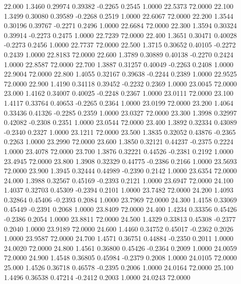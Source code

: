   22.000   1.3460   0.29974   0.39382  -0.2265   0.2545   1.0000  22.5373  72.0000
  22.100   1.3499   0.30080   0.39589  -0.2268   0.2519   1.0000  22.6067  72.0000
  22.200   1.3544   0.30196   0.39767  -0.2271   0.2496   1.0000  22.6684  72.0000
  22.300   1.3594   0.30324   0.39914  -0.2273   0.2475   1.0000  22.7239  72.0000
  22.400   1.3651   0.30471   0.40028  -0.2273   0.2456   1.0000  22.7737  72.0000
  22.500   1.3715   0.30652   0.40105  -0.2272   0.2439   1.0000  22.8183  72.0000
  22.600   1.3789   0.30889   0.40138  -0.2270   0.2424   1.0000  22.8587  72.0000
  22.700   1.3887   0.31257   0.40049  -0.2263   0.2408   1.0000  22.9004  72.0000
  22.800   1.4055   0.32167   0.39638  -0.2244   0.2389   1.0000  22.9525  72.0000
  22.900   1.4190   0.34118   0.39452  -0.2232   0.2369   1.0000  23.0045  72.0000
  23.000   1.4162   0.34007   0.40025  -0.2248   0.2367   1.0000  23.0111  72.0000
  23.100   1.4117   0.33764   0.40653  -0.2265   0.2364   1.0000  23.0199  72.0000
  23.200   1.4064   0.33436   0.41326  -0.2285   0.2359   1.0000  23.0327  72.0000
  23.300   1.3998   0.32997   0.42082  -0.2308   0.2351   1.0000  23.0544  72.0000
  23.400   1.3892   0.32334   0.43089  -0.2340   0.2327   1.0000  23.1211  72.0000
  23.500   1.3835   0.32052   0.43876  -0.2365   0.2263   1.0000  23.2990  72.0000
  23.600   1.3850   0.32121   0.44237  -0.2375   0.2224   1.0000  23.4078  72.0000
  23.700   1.3876   0.32221   0.44526  -0.2381   0.2192   1.0000  23.4945  72.0000
  23.800   1.3908   0.32329   0.44775  -0.2386   0.2166   1.0000  23.5693  72.0000
  23.900   1.3945   0.32444   0.44989  -0.2390   0.2142   1.0000  23.6354  72.0000
  24.000   1.3988   0.32567   0.45169  -0.2393   0.2121   1.0000  23.6947  72.0000
  24.100   1.4037   0.32703   0.45309  -0.2394   0.2101   1.0000  23.7482  72.0000
  24.200   1.4093   0.32864   0.45406  -0.2393   0.2084   1.0000  23.7969  72.0000
  24.300   1.4158   0.33069   0.45449  -0.2391   0.2068   1.0000  23.8409  72.0000
  24.400   1.4234   0.33356   0.45426  -0.2386   0.2054   1.0000  23.8811  72.0000
  24.500   1.4329   0.33813   0.45308  -0.2377   0.2040   1.0000  23.9189  72.0000
  24.600   1.4460   0.34752   0.45017  -0.2362   0.2026   1.0000  23.9587  72.0000
  24.700   1.4571   0.36751   0.44884  -0.2350   0.2011   1.0000  24.0020  72.0000
  24.800   1.4561   0.36800   0.45426  -0.2364   0.2009   1.0000  24.0059  72.0000
  24.900   1.4548   0.36805   0.45984  -0.2379   0.2008   1.0000  24.0105  72.0000
  25.000   1.4526   0.36718   0.46578  -0.2395   0.2006   1.0000  24.0164  72.0000
  25.100   1.4496   0.36538   0.47214  -0.2412   0.2003   1.0000  24.0243  72.0000
